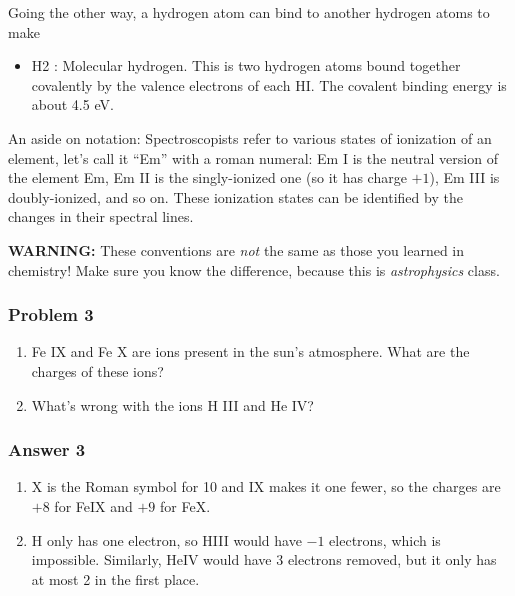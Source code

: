 \documentclass[11pt]{article}
\providecommand{\tightlist}{%
      \setlength{\itemsep}{0pt}\setlength{\parskip}{0pt}}
\begin{document}
Going the other way, a hydrogen atom can bind to another hydrogen atoms
to make

\begin{itemize}
\tightlist
\item
  H2 : Molecular hydrogen. This is two hydrogen atoms bound together
  covalently by the valence electrons of each HI. The covalent binding
  energy is about 4.5 eV.
\end{itemize}

An aside on notation: Spectroscopists refer to various states of
ionization of an element, let's call it ``Em'' with a roman numeral: Em
I is the neutral version of the element Em, Em II is the singly-ionized
one (so it has charge \(+1\)), Em III is doubly-ionized, and so on.
These ionization states can be identified by the changes in their
spectral lines.

 
\textbf{WARNING:} These conventions are \emph{not} the same as those you
learned in chemistry! Make sure you know the difference, because this is
\emph{astrophysics} class.
 

 
\subsubsection{Problem 3}\label{problem-3}

\begin{enumerate}
\def\labelenumi{\alph{enumi}.}
\item
  Fe IX and Fe X are ions present in the sun's atmosphere. What are the
  charges of these ions?
\item
  What's wrong with the ions H III and He IV?
\end{enumerate}
 

     
\subsubsection{Answer 3}\label{answer-3}

\begin{enumerate}
\def\labelenumi{\alph{enumi}.}
\item
  X is the Roman symbol for 10 and IX makes it one fewer, so the charges
  are \(+8\) for FeIX and \(+9\) for FeX.
\item
  H only has one electron, so HIII would have \(-1\) electrons, which is
  impossible. Similarly, HeIV would have 3 electrons removed, but it
  only has at most 2 in the first place.
\end{enumerate}
 
\end{document}
